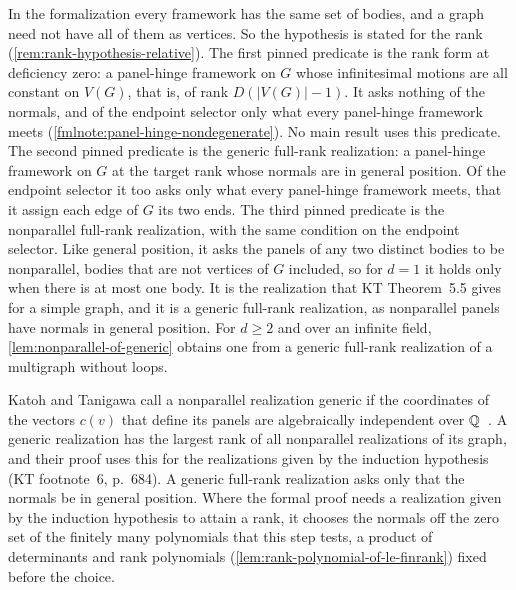 \begin{fmlnote}
  \label{fmlnote:generic-full-rank}
  In the formalization every framework has the same set of bodies, and a
  graph need not have all of them as vertices. So the hypothesis is
  stated for the rank (\cref{rem:rank-hypothesis-relative}). The first
  pinned predicate is the rank form at deficiency zero: a panel-hinge
  framework on $G$ whose infinitesimal motions are all constant on
  $V(G)$, that is, of rank $D(|V(G)| - 1)$. It asks nothing of the
  normals, and of the endpoint selector only what every panel-hinge
  framework meets (\cref{fmlnote:panel-hinge-nondegenerate}). No main
  result uses this predicate. The second pinned predicate is the generic
  full-rank realization: a panel-hinge framework on $G$ at the target
  rank whose normals are in general position. Of the endpoint selector
  it too asks only what every panel-hinge framework meets, that it
  assign each edge of $G$ its two ends. The third pinned predicate is
  the nonparallel full-rank realization, with the same condition on the
  endpoint selector. Like general position, it asks the panels of any
  two distinct bodies to be nonparallel, bodies that are not vertices of
  $G$ included, so for $d = 1$ it holds only when there is at most one
  body. It is the realization that KT Theorem~5.5 gives for a simple
  graph, and it is a generic full-rank realization, as nonparallel
  panels have normals in general position. For $d \ge 2$ and over an
  infinite field,
  \cref{lem:nonparallel-of-generic} obtains one from a generic full-rank
  realization of a multigraph without loops.

  Katoh and Tanigawa call a nonparallel realization generic if the
  coordinates of the vectors $c(v)$ that define its panels are
  algebraically independent over ${\mathbb{Q}}$~\cite[p.~668]{katohTanigawa2011}.
  A generic realization has the largest rank of all nonparallel
  realizations of its graph, and their proof uses this for the
  realizations given by the induction hypothesis (KT footnote~6, p.~684).
  A generic full-rank realization asks only that the normals be in
  general position. Where the formal proof needs a realization given by
  the induction hypothesis to attain a rank, it chooses the normals off
  the zero set of the finitely many polynomials that this step tests, a
  product of determinants and rank polynomials
  (\cref{lem:rank-polynomial-of-le-finrank}) fixed before the choice.
\end{fmlnote}

